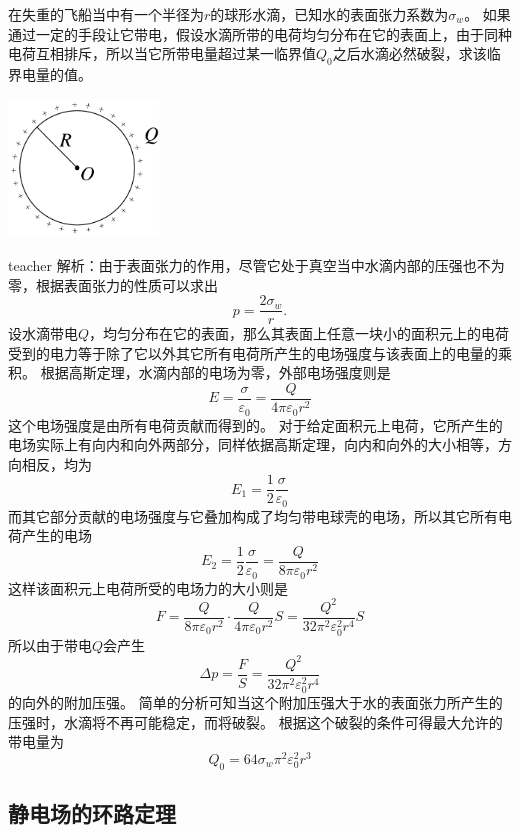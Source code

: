 \begin{example}
在失重的飞船当中有一个半径为$r$的球形水滴，已知水的表面张力系数为$\sigma_w$。
如果通过一定的手段让它带电，假设水滴所带的电荷均匀分布在它的表面上，由于同种电荷互相排斥，所以当它所带电量超过某一临界值$Q_0$之后水滴必然破裂，求该临界电量的值。
\begin{flushright}
\includegraphics[width=0.3\textwidth]{images/elec-problem-5.pdf}
\end{flushright}
\begin{taggedblock}{teacher}
\noindent
解析：由于表面张力的作用，尽管它处于真空当中水滴内部的压强也不为零，根据表面张力的性质可以求出
\[
p=\frac{2\sigma_w}{r}.
\]
设水滴带电$Q$，均匀分布在它的表面，那么其表面上任意一块小的面积元上的电荷受到的电力等于除了它以外其它所有电荷所产生的电场强度与该表面上的电量的乘积。
根据高斯定理，水滴内部的电场为零，外部电场强度则是
\[
E=\frac{\sigma}{\varepsilon_0}=\frac{Q}{4\pi\varepsilon_0 r^2}
\]
这个电场强度是由所有电荷贡献而得到的。
对于给定面积元上电荷，它所产生的电场实际上有向内和向外两部分，同样依据高斯定理，向内和向外的大小相等，方向相反，均为
\[
E_1 = \frac{1}{2}\frac{\sigma}{\varepsilon_0}
\]
而其它部分贡献的电场强度与它叠加构成了均匀带电球壳的电场，所以其它所有电荷产生的电场
\[
E_2 =  \frac{1}{2}\frac{\sigma}{\varepsilon_0} = \frac{Q}{8\pi\varepsilon_0 r^2}
\]
这样该面积元上电荷所受的电场力的大小则是
\[
F = \frac{Q}{8\pi\varepsilon_0 r^2}\cdot \frac{Q}{4\pi\varepsilon_0 r^2}S = \frac{Q^2}{32\pi^2\varepsilon_0^2r^4}S 
\]
所以由于带电$Q$会产生
\[
\Delta p = \frac{F}{S} = \frac{Q^2}{32\pi^2\varepsilon_0^2r^4}
\]
的向外的附加压强。
简单的分析可知当这个附加压强大于水的表面张力所产生的压强时，水滴将不再可能稳定，而将破裂。
根据这个破裂的条件可得最大允许的带电量为
\[
Q_0=64\sigma_w\pi^2\varepsilon_0^2r^3
\]
\end{taggedblock}
\end{example}

\subsection{静电场的环路定理}

